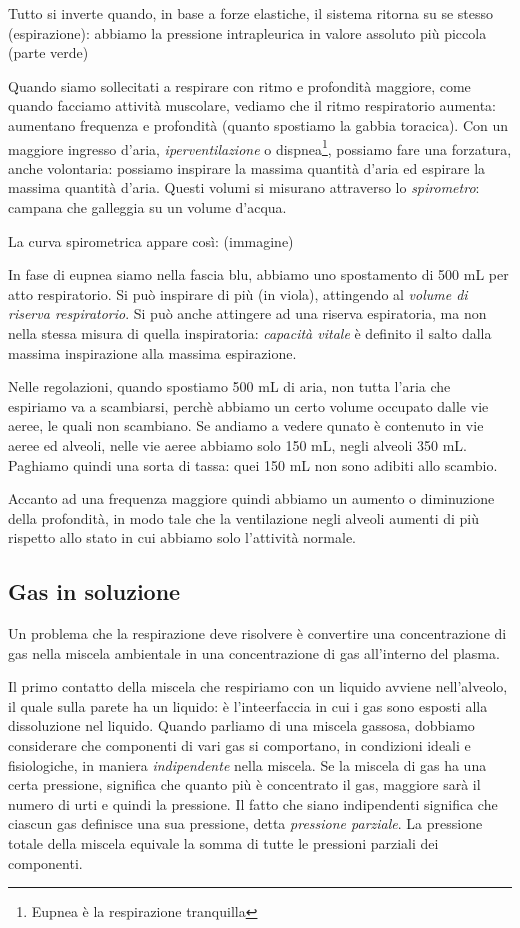 \documentclass[a4paper,12pt]{article}
\begin{document}
Tutto si inverte quando, in base a forze elastiche, il sistema ritorna su se stesso (espirazione): abbiamo la pressione intrapleurica in valore assoluto più piccola (parte verde)
 
Quando siamo sollecitati a respirare con ritmo e profondità maggiore, come quando facciamo attività muscolare, vediamo che il ritmo respiratorio aumenta: aumentano frequenza e profondità (quanto spostiamo la gabbia toracica). Con un maggiore ingresso d'aria, \emph{iperventilazione} o dispnea\footnote{Eupnea è la respirazione tranquilla}, possiamo fare una forzatura, anche volontaria: possiamo inspirare la massima quantità d'aria ed espirare la massima quantità d'aria. Questi volumi si misurano attraverso lo \emph{spirometro}: campana che galleggia su un volume d'acqua. 

La curva spirometrica appare così: (immagine) 

In fase di eupnea siamo nella fascia blu, abbiamo uno spostamento di 500 mL per atto respiratorio. Si può inspirare di più (in viola), attingendo al \emph{volume di riserva respiratorio}. Si può anche attingere ad una riserva espiratoria, ma non nella stessa misura di quella inspiratoria: \emph{capacità vitale} è definito il salto dalla massima inspirazione alla massima espirazione.

Nelle regolazioni, quando spostiamo 500 mL di aria, non tutta l'aria che espiriamo va a scambiarsi, perchè abbiamo un certo volume occupato dalle vie aeree, le quali non scambiano. Se andiamo a vedere qunato è contenuto in vie aeree ed alveoli, nelle vie aeree abbiamo solo 150 mL, negli alveoli 350 mL. Paghiamo quindi una sorta di tassa: quei 150 mL non sono adibiti allo scambio.

Accanto ad una frequenza maggiore quindi abbiamo un aumento o diminuzione della profondità, in modo tale che la ventilazione negli alveoli aumenti di più rispetto allo stato in cui abbiamo solo l'attività normale.

\subsection{Gas in soluzione}
Un problema che la respirazione deve risolvere è convertire una concentrazione di gas nella miscela ambientale in una concentrazione di gas all'interno del plasma.

Il primo contatto della miscela che respiriamo con un liquido avviene nell'alveolo, il quale sulla parete ha un liquido: è l'inteerfaccia in cui i gas sono esposti alla dissoluzione nel liquido. Quando parliamo di una miscela gassosa, dobbiamo considerare che componenti di vari gas si comportano, in condizioni ideali e fisiologiche, in maniera \emph{indipendente} nella miscela. Se la miscela di gas ha una certa pressione, significa che quanto più è concentrato il gas, maggiore sarà il numero di urti e quindi la pressione. Il fatto che siano indipendenti significa che ciascun gas definisce una sua pressione, detta \emph{pressione parziale}. La pressione totale della miscela equivale la somma di tutte le pressioni parziali dei componenti.
\end{document}
